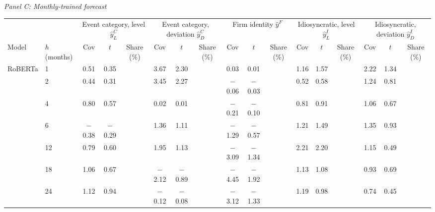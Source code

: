 \begin{table}[htbp]
{\begin{adjustbox}{max width=\linewidth, max totalheight=0.20\textheight}
\end{adjustbox}
\par\medskip
\textit{Panel C: Monthly-trained forecast}\\[2pt]
\begin{adjustbox}{max width=\linewidth, max totalheight=0.20\textheight}
\begin{tabular}{llccccccccccccccc}
\toprule
\multicolumn{2}{c}{} & \multicolumn{3}{c}{Event category, level $\hat y^C_L$} & \multicolumn{3}{c}{Event category, deviation $\hat y^C_D$} & \multicolumn{3}{c}{Firm identity $\hat y^F$} & \multicolumn{3}{c}{Idiosyncratic, level $\hat y^I_L$} & \multicolumn{3}{c}{Idiosyncratic, deviation $\hat y^I_D$} \\
\cmidrule(lr){3-5} \cmidrule(lr){6-8} \cmidrule(lr){9-11} \cmidrule(lr){12-14} \cmidrule(lr){15-17}
Model & $h$ (months) & Cov & $t$ & Share (\%) & Cov & $t$ & Share (\%) & Cov & $t$ & Share (\%) & Cov & $t$ & Share (\%) & Cov & $t$ & Share (\%) \\
\midrule
RoBERTa & 1 & \phantom{$-$}0.51 & \phantom{$-$}0.35 &  & \phantom{$-$}3.67 & \phantom{$-$}2.30 &  & \phantom{$-$0}0.03 & \phantom{$-$}0.01 &  & \phantom{0}1.16 & 1.57 &  & \phantom{$-$}2.22 & \phantom{$-$}1.34 &  \\
 & 2 & \phantom{$-$}0.44 & \phantom{$-$}0.31 &  & \phantom{$-$}3.45 & \phantom{$-$}2.27 &  & \phantom{0}$-$0.06 & $-$0.03 &  & \phantom{0}0.52 & 0.58 &  & \phantom{$-$}1.24 & \phantom{$-$}0.81 &  \\
 & 4 & \phantom{$-$}0.80 & \phantom{$-$}0.57 &  & \phantom{$-$}0.02 & \phantom{$-$}0.01 &  & \phantom{0}$-$0.21 & $-$0.10 &  & \phantom{0}0.81 & 0.91 &  & \phantom{$-$}1.06 & \phantom{$-$}0.67 &  \\
 & 6 & $-$0.38 & $-$0.29 &  & \phantom{$-$}1.36 & \phantom{$-$}1.11 &  & \phantom{0}$-$1.29 & $-$0.57 &  & \phantom{0}1.21 & 1.49 &  & \phantom{$-$}1.35 & \phantom{$-$}0.93 &  \\
 & 12 & \phantom{$-$}0.79 & \phantom{$-$}0.60 &  & \phantom{$-$}1.95 & \phantom{$-$}1.13 &  & \phantom{0}$-$3.09 & $-$1.34 &  & \phantom{0}2.21 & 2.20 &  & \phantom{$-$}1.15 & \phantom{$-$}0.49 &  \\
 & 18 & \phantom{$-$}1.06 & \phantom{$-$}0.67 &  & $-$2.12 & $-$0.89 &  & \phantom{0}$-$4.45 & $-$1.92 &  & \phantom{0}1.13 & 1.08 &  & \phantom{$-$}0.93 & \phantom{$-$}0.69 &  \\
 & 24 & \phantom{$-$}1.12 & \phantom{$-$}0.94 &  & $-$0.12 & $-$0.08 &  & \phantom{0}$-$3.12 & $-$1.33 &  & \phantom{0}1.19 & 0.98 &  & \phantom{$-$}0.74 & \phantom{$-$}0.45 &  \\

\end{tabular}
\end{adjustbox}}
\end{table}
